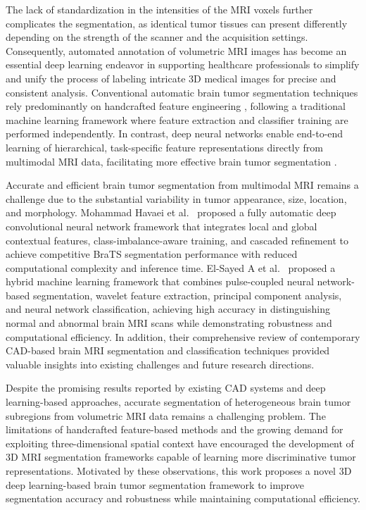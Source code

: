 \documentclass[a4paper,fleqn]{cas-dc}
\begin{document}
The lack of standardization in the intensities of the MRI voxels further complicates the segmentation, as identical tumor tissues can present differently depending on the strength of the scanner and the acquisition settings. Consequently, automated annotation of volumetric MRI images has become an essential deep learning endeavor in supporting healthcare professionals to simplify and unify the process of labeling intricate 3D medical images for precise and consistent analysis. Conventional automatic brain tumor segmentation techniques rely predominantly on handcrafted feature engineering \cite{menze2014multimodal}, following a traditional machine learning framework where feature extraction and classifier training are performed independently. In contrast, deep neural networks enable end-to-end learning of hierarchical, task-specific feature representations directly from multimodal MRI data, facilitating more effective brain tumor segmentation \cite{bengio2013representation}.

{\sloppy Accurate and efficient brain tumor segmentation from multimodal MRI remains a challenge due to the substantial variability in tumor appearance, size, location, and morphology. Mohammad Havaei et al.~\cite{havaei2017brain} proposed a fully automatic deep convolutional neural network framework that integrates local and global contextual features, class-imbalance-aware training, and cascaded refinement to achieve competitive BraTS segmentation performance with reduced computational complexity and inference time. El-Sayed A et al.~\cite{el2014computer} proposed a hybrid machine learning framework that combines pulse-coupled neural network-based segmentation, wavelet feature extraction, principal component analysis, and neural network classification, achieving high accuracy in distinguishing normal and abnormal brain MRI scans while demonstrating robustness and computational efficiency. In addition, their comprehensive review of contemporary CAD-based brain MRI segmentation and classification techniques \cite{maitra2008hybrid, el2010hybrid, cheng2010automated, cherkassky2007learning} provided valuable insights into existing challenges and future research directions.\par}

Despite the promising results reported by existing CAD systems and deep learning-based approaches, accurate segmentation of heterogeneous brain tumor subregions from volumetric MRI data remains a challenging problem. The limitations of handcrafted feature-based methods and the growing demand for exploiting three-dimensional spatial context have encouraged the development of 3D MRI segmentation frameworks capable of learning more discriminative tumor representations. Motivated by these observations, this work proposes a novel 3D deep learning-based brain tumor segmentation framework to improve segmentation accuracy and robustness while maintaining computational efficiency.
\end{document}
